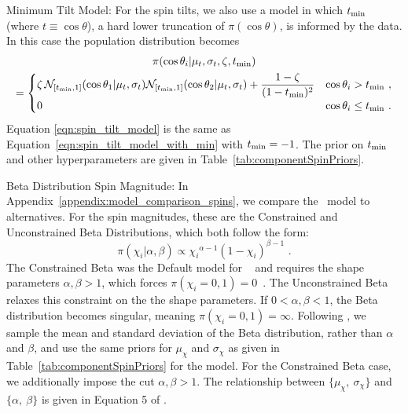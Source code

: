 {\sc Minimum Tilt Model}:
For the spin tilts, we also use a model in which $t_{\rm min}$ (where $t\equiv\cos\theta$), a hard lower truncation of $\pi(\cos\theta)$, is informed by the data. 
In this case the population distribution becomes 
\begin{multline}
    \pi(\cos\theta_i| \mu_t, \sigma_t, \zeta, t_{\rm min} ) \\ =
	\begin{cases} 
        \zeta \,\mathcal{N}_{[t_{\rm min},1]}(\cos\theta_1 | \mu_t, \sigma_t)\mathcal{N}_{[t_{\rm min},1]}(\cos\theta_2 | \mu_t, \sigma_t) + \displaystyle \frac{1-\zeta}{(1-t_{\rm min})^2} & \cos\theta_i > t_{\rm min}\,\,, \\
        0 & \cos\theta_i \leq t_{\rm min}\,\,.
	\end{cases}
	\label{eqn:spin_tilt_model_with_min}
\end{multline}
Equation \eqref{eqn:spin_tilt_model} is the same as Equation~\eqref{eqn:spin_tilt_model_with_min} with $t_{\rm min} = - 1$.
The prior on $t_{\rm min}$ and other hyperparameters are given in Table~\ref{tab:componentSpinPriors}.

{\sc Beta Distribution Spin Magnitude}:
In Appendix~\ref{appendix:model_comparison_spins}, we compare the ~model to alternatives.
For the spin magnitudes, these are the Constrained and Unconstrained Beta Distributions, which both follow the form:
\begin{equation}
	\pi(\chi_i | \alpha, \beta) \propto {\chi_i}^{\alpha-1}{(1-\chi_i)}^{\beta-1} \,\,.
	\label{eqn:beta_distribution}
\end{equation}
The Constrained Beta was the {\sc Default} model for \gwtcthree~\citep{KAGRA:2021duu} and requires the shape parameters $\alpha, \beta > 1$, which forces $\pi(\chi_i=0,1) = 0$~\citep{Wysocki:2018mpo, LIGOScientific:2020kqk}.
The Unconstrained Beta relaxes this constraint on the the shape parameters. 
If $0< \alpha,\beta < 1$, the Beta distribution becomes singular, meaning $\pi(\chi_i=0,1) = \infty$.
Following \cite{KAGRA:2021duu}, we sample the mean and standard deviation of the Beta distribution, rather than $\alpha$ and $\beta$, and use the same priors for $\mu_\chi$ and $\sigma_\chi$ as given in Table~\ref{tab:componentSpinPriors} for the  model.
For the Constrained Beta case, we additionally impose the cut $\alpha, \beta > 1$.
The relationship between $\{\mu_\chi,~\sigma_\chi\}$ and $\{\alpha,~\beta\}$ is given in Equation 5 of \cite{LIGOScientific:2018jsj}.



